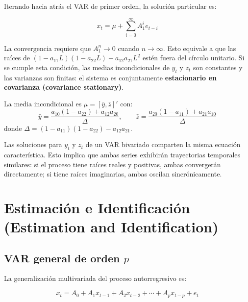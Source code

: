 \documentclass[12pt]{article}
\begin{document}
Iterando hacia atr\'as el VAR de primer orden, la soluci\'on particular es:

\begin{equation}
x_t = \mu + \sum_{i=0}^{\infty} A_1^i e_{t-i}
\end{equation}

\begin{intuicionmat}
La convergencia requiere que $A_1^n \to 0$ cuando $n \to \infty$. Esto equivale a que las ra\'ices de $(1-a_{11}L)(1-a_{22}L) - a_{12}a_{21}L^2$ est\'en fuera del c\'irculo unitario. Si se cumple esta condici\'on, las medias incondicionales de $y_t$ y $z_t$ son constantes y las varianzas son finitas: el sistema es conjuntamente \textbf{estacionario en covarianza (covariance stationary)}.
\end{intuicionmat}

La media incondicional es $\mu = [\bar{y}, \bar{z}]'$ con:
\[
\bar{y} = \frac{a_{10}(1-a_{22}) + a_{12}a_{20}}{\Delta}, \qquad \bar{z} = \frac{a_{20}(1-a_{11}) + a_{21}a_{10}}{\Delta}
\]
donde $\Delta = (1-a_{11})(1-a_{22}) - a_{12}a_{21}$.

\begin{intuicion}
Las soluciones para $y_t$ y $z_t$ de un VAR bivariado comparten la misma ecuaci\'on caracter\'istica. Esto implica que ambas series exhibir\'an trayectorias temporales similares: si el proceso tiene ra\'ices reales y positivas, ambas converger\'an directamente; si tiene ra\'ices imaginarias, ambas oscilan sincr\'onicamente.
\end{intuicion}

\section{Estimaci\'on e Identificaci\'on (Estimation and Identification)}

\subsection{VAR general de orden $p$}

La generalizaci\'on multivariada del proceso autorregresivo es:

\begin{equation}
x_t = A_0 + A_1 x_{t-1} + A_2 x_{t-2} + \cdots + A_p x_{t-p} + e_t
\end{equation}
\end{document}
